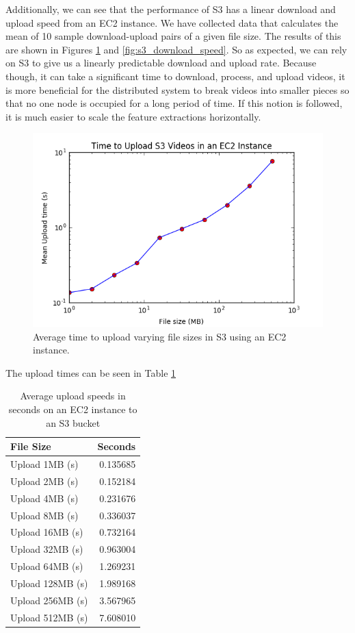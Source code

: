 \FloatBarrier

Additionally, we can see that the performance of S3 has a linear download and upload
speed from an EC2 instance. We have collected data that calculates the mean of 10
sample download-upload pairs of a given file size. The results of this are shown
in Figures \ref{fig:s3_upload_speed} and \ref{fig:s3_download_speed}. So as expected,
we can rely on S3 to give us a linearly predictable download and upload rate.
Because though, it can take a significant time to download, process, and upload videos,
it is more beneficial for the distributed system to break videos into smaller
pieces so that no one node is occupied for a long period of time. If this
notion is followed, it is much easier to scale the feature extractions horizontally.

\begin{figure}[h]
  \centering
  \includegraphics[width=.8\textwidth]{figures/s3_upload_speed}
  \caption{Average time to upload varying file sizes in S3 using an EC2 instance. }
  \label{fig:s3_upload_speed}
\end{figure}


The upload times can be seen in Table \ref{tab:upload_speed}
\begin{table}[h]
  \begin{tabular}{lr}
\toprule
{File Size} &         Seconds \\
\midrule
Upload 1MB (s)   &  0.135685 \\
Upload 2MB (s)   &  0.152184 \\
Upload 4MB (s)   &  0.231676 \\
Upload 8MB (s)   &  0.336037 \\
Upload 16MB (s)  &  0.732164 \\
Upload 32MB (s)  &  0.963004 \\
Upload 64MB (s)  &  1.269231 \\
Upload 128MB (s) &  1.989168 \\
Upload 256MB (s) &  3.567965 \\
Upload 512MB (s) &  7.608010 \\
\bottomrule
\end{tabular}
\caption{Average upload speeds in seconds on an EC2 instance to an S3 bucket}
\label{tab:upload_speed}
\end{table}


